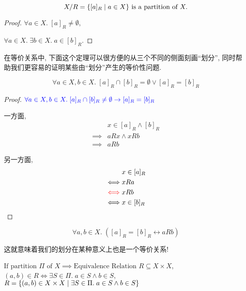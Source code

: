 \begin{theorem}
  \[
    X/R = \{[a]_{R} \mid a \in X\} \text{ is a partition of } X.
  \]
\end{theorem}

\begin{proof}
  $\forall a \in X.\; [a]_{R} \neq \emptyset$, 

  $\forall a \in X.\; \exists b \in X.\; a \in [b]_{R}$.
\end{proof}

在等价关系中, 下面这个定理可以很方便的从三个不同的侧面刻画``划分'', 同时帮助我们更容易的证明某些由``划分''产生的等价性问题. 

\begin{theorem}
  \[
      \forall a \in X, b \in X.\; [a]_{R} \cap [b]_{R} = \emptyset \lor [a]_{R} = [b]_{R}
  \]
\end{theorem}

\begin{proof}
  $\textcolor{blue}{\forall a \in X, b \in X.\; [a]_{R} \cap [b]_{R} \neq \emptyset \to [a]_{R} = [b]_{R}}$

  一方面, 
      \setcounter{equation}{0}
      \begin{align*}
        &x \in [a]_{R} \land [b]_{R} \\
        \implies& aRx \land xRb \\
        \implies& aRb
      \end{align*}

  另一方面, 
      \setcounter{equation}{0}
      \begin{align*}
        &x \in [a]_{R} \\
        \iff& x R a \\
        \textcolor{red}{\iff}& x R b \\
        \iff& x \in [b]_{R}
      \end{align*}
\end{proof}


\begin{theorem}
  \[
    \forall a, b \in X.\; ([a]_{R} = [b]_{R} \leftrightarrow a R b)
  \]
\end{theorem}

这就意味着我们的划分在某种意义上也是一个等价关系! 

\begin{definition}
  $\text{If partition } \Pi \text{ of } X \implies \text{Equivalence Relation } R \subseteq X \times X$, $(a, b) \in R \iff \exists S \in \Pi.\; a \in S \land b \in S$, $R = \{(a, b) \in X \times X \mid \exists S \in \Pi.\; a \in S \land b \in S\}$
\end{definition}

